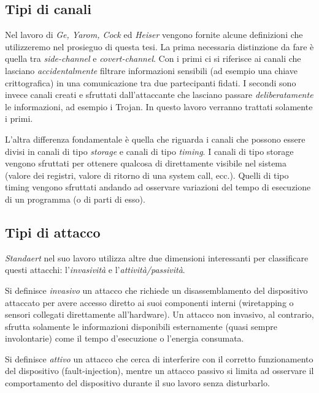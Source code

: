 		\subsection*{Tipi di canali}	
			Nel lavoro di \emph{Ge, Yarom, Cock} ed \emph{Heiser}\cite{ge2016survey} vengono fornite alcune definizioni che utilizzeremo nel prosieguo di questa tesi. La prima necessaria distinzione da fare è quella tra \emph{side-channel} e \emph{covert-channel}. Con i primi ci si riferisce ai canali che lasciano \emph{accidentalmente} filtrare informazioni sensibili (ad esempio una chiave crittografica) in una comunicazione tra due partecipanti fidati. I secondi sono invece canali creati e sfruttati dall'attaccante che lasciano passare \emph{deliberatamente} le informazioni, ad esempio i Trojan. In questo lavoro verranno trattati solamente i primi.
			
			L'altra differenza fondamentale è quella che riguarda i canali che possono essere divisi in canali di tipo \emph{storage} e canali di tipo \emph{timing}. I canali di tipo storage vengono sfruttati per ottenere qualcosa di direttamente visibile nel sistema (valore dei registri, valore di ritorno di una system call, ecc.). Quelli di tipo timing vengono sfruttati andando ad osservare variazioni del tempo di esecuzione di un programma (o di parti di esso).
			
		\subsection*{Tipi di attacco}		
			\emph{Standaert} nel suo lavoro \cite{standaert2010introduction} utilizza altre due dimensioni interessanti per classificare questi attacchi: l'\emph{invasività} e l'\emph{attività/passività}. 
			
			Si definisce \emph{invasivo} un attacco che richiede un disassemblamento del dispositivo attaccato per avere accesso diretto ai suoi componenti interni (wiretapping o sensori collegati direttamente all'hardware). Un attacco non invasivo, al contrario, sfrutta solamente le informazioni disponibili esternamente (quasi sempre involontarie) come il tempo d'esecuzione o l'energia consumata.
			
			Si definisce \emph{attivo} un attacco che cerca di interferire con il corretto funzionamento del dispositivo (fault-injection)\cite{giraud2004dfa,karri2001fault}, mentre un attacco passivo si limita ad osservare il comportamento del dispositivo durante il suo lavoro senza disturbarlo. 
			
